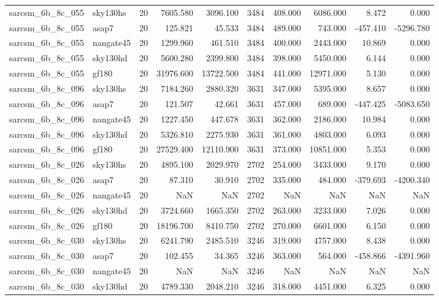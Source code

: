 \begin{longtable}{llrrrrrrrr}
sarcsm\_6b\_8c\_055 & sky130hs & 20 & 7605.580 & 3096.100 & 3484 & 408.000 & 6086.000 & 8.472 & 0.000 \\
sarcsm\_6b\_8c\_055 & asap7 & 20 & 125.821 & 45.533 & 3484 & 489.000 & 743.000 & -457.410 & -5296.780 \\
sarcsm\_6b\_8c\_055 & nangate45 & 20 & 1299.960 & 461.510 & 3484 & 400.000 & 2443.000 & 10.869 & 0.000 \\
sarcsm\_6b\_8c\_055 & sky130hd & 20 & 5600.280 & 2399.800 & 3484 & 398.000 & 5450.000 & 6.144 & 0.000 \\
sarcsm\_6b\_8c\_055 & gf180 & 20 & 31976.600 & 13722.500 & 3484 & 441.000 & 12971.000 & 5.130 & 0.000 \\
sarcsm\_6b\_8c\_096 & sky130hs & 20 & 7184.260 & 2880.320 & 3631 & 347.000 & 5395.000 & 8.657 & 0.000 \\
sarcsm\_6b\_8c\_096 & asap7 & 20 & 121.507 & 42.661 & 3631 & 457.000 & 689.000 & -447.425 & -5083.650 \\
sarcsm\_6b\_8c\_096 & nangate45 & 20 & 1227.450 & 447.678 & 3631 & 362.000 & 2186.000 & 10.984 & 0.000 \\
sarcsm\_6b\_8c\_096 & sky130hd & 20 & 5326.810 & 2275.930 & 3631 & 361.000 & 4803.000 & 6.093 & 0.000 \\
sarcsm\_6b\_8c\_096 & gf180 & 20 & 27529.400 & 12110.900 & 3631 & 373.000 & 10851.000 & 5.353 & 0.000 \\
sarcsm\_6b\_8c\_026 & sky130hs & 20 & 4895.100 & 2029.970 & 2702 & 254.000 & 3433.000 & 9.170 & 0.000 \\
sarcsm\_6b\_8c\_026 & asap7 & 20 & 87.310 & 30.910 & 2702 & 335.000 & 484.000 & -379.693 & -4200.340 \\
sarcsm\_6b\_8c\_026 & nangate45 & 20 & NaN & NaN & 2702 & NaN & NaN & NaN & NaN \\
sarcsm\_6b\_8c\_026 & sky130hd & 20 & 3724.660 & 1665.350 & 2702 & 263.000 & 3233.000 & 7.026 & 0.000 \\
sarcsm\_6b\_8c\_026 & gf180 & 20 & 18196.700 & 8410.750 & 2702 & 270.000 & 6601.000 & 6.150 & 0.000 \\
sarcsm\_6b\_8c\_030 & sky130hs & 20 & 6241.790 & 2485.510 & 3246 & 319.000 & 4757.000 & 8.438 & 0.000 \\
sarcsm\_6b\_8c\_030 & asap7 & 20 & 102.455 & 34.365 & 3246 & 363.000 & 564.000 & -458.866 & -4391.960 \\
sarcsm\_6b\_8c\_030 & nangate45 & 20 & NaN & NaN & 3246 & NaN & NaN & NaN & NaN \\
sarcsm\_6b\_8c\_030 & sky130hd & 20 & 4789.330 & 2048.210 & 3246 & 318.000 & 4451.000 & 6.325 & 0.000 \\

\end{longtable}
